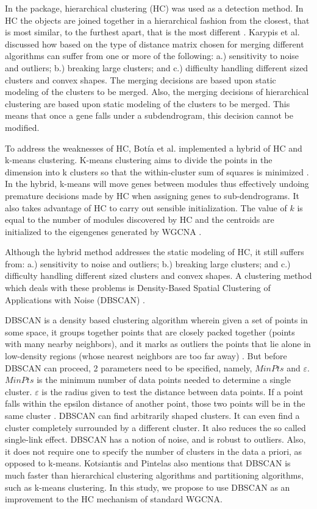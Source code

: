\documentclass[sigconf,authordraft]{acmart}
\begin{document}
In the package, hierarchical clustering (HC) was used as a detection method. In HC the objects are joined together in a hierarchical fashion from the closest, that is most similar, to the furthest apart, that is the most different \cite{Greenacre2008}. Karypis et al. \cite{KarypisEtal1999} discussed how based on the type of distance matrix chosen for merging different algorithms can suffer from one or more of the following: a.) sensitivity to noise and outliers; b.) breaking large clusters; and c.) difficulty handling different sized clusters and convex shapes. The merging decisions are based upon static modeling of the clusters to be merged. Also, the merging decisions of hierarchical clustering are based upon static modeling of the clusters to be merged. This means that once a gene falls under a subdendrogram, this decision cannot be modified.

To address the weaknesses of HC, Bot\'{i}a et al. \cite{BotiaEtal2017} implemented a hybrid of HC and k-means clustering. K-means clustering aims to divide the points in the dimension into k clusters so that the within-cluster sum of squares is minimized \cite{HartiganWong1979}. In the hybrid, k-means will move genes between modules thus effectively undoing premature decisions made by HC when assigning genes to sub-dendrograms. It also takes advantage of HC to carry out sensible initialization. The value of $k$ is equal to the number of modules discovered by HC and the centroids are initialized to the eigengenes generated by WGCNA \cite{BotiaEtal2017}.

Although the hybrid method addresses the static modeling of HC, it still suffers from: a.) sensitivity to noise and outliers; b.) breaking large clusters; and c.) difficulty handling different sized clusters and convex shapes. A clustering method which deals with these problems is Density-Based Spatial Clustering of Applications with Noise (DBSCAN) \cite{EsterEtal1996}. 

DBSCAN is a density based clustering algorithm wherein given a set of points in some space, it groups together points that are closely packed together (points with many nearby neighbors), and it marks as outliers the points that lie alone in low-density regions (whose nearest neighbors are too far away) \cite{EsterEtal1996}. But before DBSCAN can proceed, 2 parameters need to be specified, namely, $MinPts$ and $\varepsilon$. $MinPts$ is the minimum number of data points needed to determine a single cluster. $\varepsilon$ is the radius given to test the distance between data points. If a point falls within the epsilon distance of another point, those two points will be in the same cluster \cite{Lutins2017}. DBSCAN can find arbitrarily shaped clusters. It can even find a cluster completely surrounded by a different cluster. It also reduces the so called single-link effect. DBSCAN has a notion of noise, and is robust to outliers. Also, it does not require one to specify the number of clusters in the data a priori, as opposed to k-means. Kotsiantis and Pintelas \cite{KotsiantisandPintelas2004} also mentions that DBSCAN is much faster than hierarchical clustering algorithms and partitioning algorithms, such as k-means clustering. In this study, we propose to use DBSCAN as an improvement to the HC mechanism of standard WGCNA.
\end{document}
